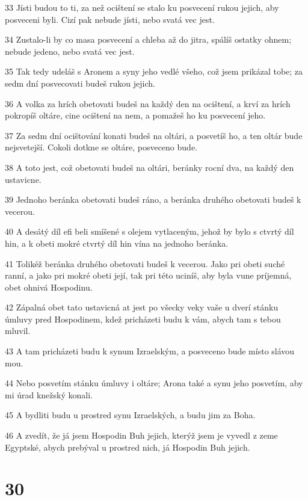 \par 33 Jísti budou to ti, za než ocištení se stalo ku posvecení rukou jejich, aby posveceni byli. Cizí pak nebude jísti, nebo svatá vec jest.
\par 34 Zustalo-li by co masa posvecení a chleba až do jitra, spálíš ostatky ohnem; nebude jedeno, nebo svatá vec jest.
\par 35 Tak tedy udeláš s Aronem a syny jeho vedlé všeho, což jsem prikázal tobe; za sedm dní posvecovati budeš rukou jejich.
\par 36 A volka za hrích obetovati budeš na každý den na ocištení, a krví za hrích pokropíš oltáre, cine ocištení na nem, a pomažeš ho ku posvecení jeho.
\par 37 Za sedm dní ocištování konati budeš na oltári, a posvetíš ho, a ten oltár bude nejsvetejší. Cokoli dotkne se oltáre, posveceno bude.
\par 38 A toto jest, což obetovati budeš na oltári, beránky rocní dva, na každý den ustavicne.
\par 39 Jednoho beránka obetovati budeš ráno, a beránka druhého obetovati budeš k vecerou.
\par 40 A desátý díl efi beli smíšené s olejem vytlaceným, jehož by bylo s ctvrtý díl hin, a k obeti mokré ctvrtý díl hin vína na jednoho beránka.
\par 41 Tolikéž beránka druhého obetovati budeš k vecerou. Jako pri obeti suché ranní, a jako pri mokré obeti její, tak pri této uciníš, aby byla vune príjemná, obet ohnivá Hospodinu.
\par 42 Zápalná obet tato ustavicná at jest po všecky veky vaše u dverí stánku úmluvy pred Hospodinem, kdež pricházeti budu k vám, abych tam s tebou mluvil.
\par 43 A tam pricházeti budu k synum Izraelským, a posveceno bude místo slávou mou.
\par 44 Nebo posvetím stánku úmluvy i oltáre; Arona také a synu jeho posvetím, aby mi úrad knežský konali.
\par 45 A bydliti budu u prostred synu Izraelských, a budu jim za Boha.
\par 46 A zvedít, že já jsem Hospodin Buh jejich, kterýž jsem je vyvedl z zeme Egyptské, abych prebýval u prostred nich, já Hospodin Buh jejich.

\chapter{30}

